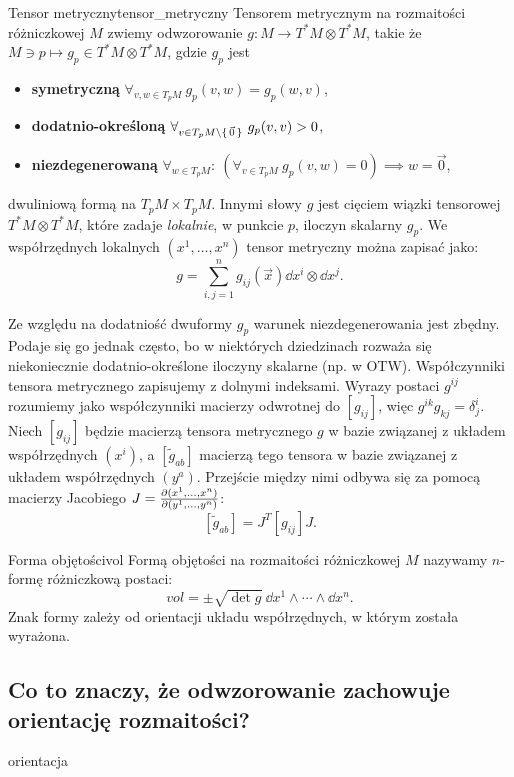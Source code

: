\documentclass{article}
\begin{document}
\begin{dfn}{Tensor metryczny}{tensor_metryczny}
  Tensorem metrycznym na rozmaitości różniczkowej $M$ zwiemy odwzorowanie $g:M\to T^*M\otimes T^*M$, takie że $M\ni p\mapsto g_p\in T^*M\otimes T^*M$, gdzie $g_p$ jest 
  \begin{itemize}
    \item \textbf{symetryczną} $\forall_{v, w\in T_pM}\ g_p(v,w) = g_p(w,v)$,
    \item \textbf{dodatnio-określoną} $\forall_{v\in T_pM\setminus\set{\vec{0}}}\ g_p(v,v)>0$,
    \item \textbf{niezdegenerowaną} $\forall_{w\in T_pM}:\ (\forall_{v\in T_pM}\ g_p(v,w)=0)\implies w=\vec{0}$,
  \end{itemize}
  dwuliniową formą na $T_pM\times T_pM$. Innymi słowy $g$ jest cięciem wiązki tensorowej $T^*M\otimes T^*M$, które zadaje \textit{lokalnie}, w punkcie $p$, iloczyn skalarny $g_p$. We współrzędnych lokalnych $(x^1,\ldots,x^n)$ tensor metryczny można zapisać jako:
  \[
  g = \sum_{i,j=1}^{n}g_{ij}(\vec{x})\dd{x^i}\otimes\dd{x^j}.
  \]
\end{dfn}
Ze względu na dodatniość dwuformy $g_p$ warunek niezdegenerowania jest zbędny. Podaje się go jednak często, bo w niektórych dziedzinach rozważa się niekoniecznie dodatnio-określone iloczyny skalarne (np. w OTW).
Współczynniki tensora metrycznego zapisujemy z dolnymi indeksami. Wyrazy postaci $g^{ij}$ rozumiemy jako współczynniki macierzy odwrotnej do $[g_{ij}]$, więc $g^{ik}g_{kj}=\delta^i_j$. Niech \( [g_{ij}] \) będzie macierzą tensora metrycznego \( g \) w bazie związanej z układem współrzędnych \( (x^i) \), a \( [\widetilde{g}_{ab}] \) macierzą tego tensora w bazie związanej z układem współrzędnych \( (y^a) \). Przejście między nimi odbywa się za pomocą macierzy Jacobiego  $J = \pdv{(x^1,\ldots,x^n)}{(y^1,\ldots,y^n)}$:  
\[
[\widetilde{g}_{ab}] = J^T [g_{ij}] J.
\]

\begin{dfn}{Forma objętości}{vol}
  Formą objętości na rozmaitości różniczkowej $M$ nazywamy $n$-formę różniczkową postaci:
  \[
  vol = \pm\sqrt{\det g}\ \dd{x^1}\wedge\cdots\wedge\dd{x^n}.
  \]
  Znak formy zależy od orientacji układu współrzędnych, w którym została wyrażona.
\end{dfn}














\subsection{Co to znaczy, że odwzorowanie zachowuje orientację rozmaitości?}{orientacja}
\end{document}
